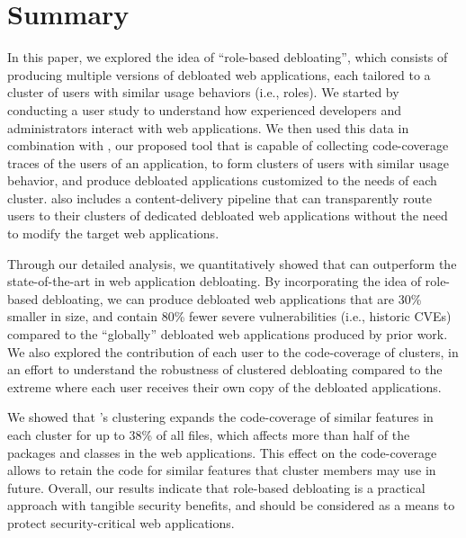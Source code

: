 \section{Summary}

In this paper, we explored the idea of ``role-based debloating'', which consists of producing multiple versions of debloated web applications, each tailored to a cluster of users with similar usage behaviors (i.e., roles). 
We started by conducting a user study to understand how experienced developers and administrators interact with web applications. 
We then used this data in combination with \sys{}, our proposed tool that is capable of collecting code-coverage traces of the users of an application, to form clusters of users with similar usage behavior, and produce debloated applications customized to the needs of each cluster. 
\sys{} also includes a content-delivery pipeline that can transparently route users to their clusters of dedicated debloated web applications without the need to modify the target web applications. 

Through our detailed analysis, we quantitatively showed that \sys{} can outperform the state-of-the-art in web application debloating. 
By incorporating the idea of role-based debloating, we can produce debloated web applications that are 30\% smaller in size, and contain 80\% fewer severe vulnerabilities (i.e., historic CVEs) compared to the ``globally'' debloated web applications produced by prior work. We also explored the contribution of each user to the code-coverage of clusters, in an effort to understand the robustness of clustered debloating compared to the extreme where each user receives their own copy of the debloated applications. 

We showed that \sys{}'s clustering expands the code-coverage of similar features in each cluster for up to 38\% of all files, which affects more than half of the packages and classes in the web applications. This effect on the code-coverage allows \sys{} to retain the code for similar features that cluster members may use in future. 
Overall, our results indicate that role-based debloating is a practical approach with tangible security benefits, and should be considered as a means to protect security-critical web applications. 

